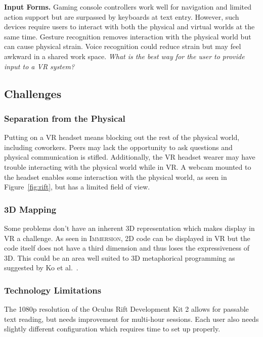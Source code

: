 \documentclass[conference]{IEEEtran}
\begin{document}
\textbf{Input Forms.}
Gaming console controllers work well for navigation and limited action support but are surpassed by keyboards at text entry.
However, such devices require users to interact with both the physical and virtual worlds at the same time.
Gesture recognition removes interaction with the physical world but can cause physical strain.
Voice recognition could reduce strain but may feel awkward in a shared work space.
\emph{What is the best way for the user to provide input to a VR system?}

\subsection{Challenges}

\subsubsection{Separation from the Physical}
Putting on a VR headset means blocking out the rest of the physical world, including coworkers.
Peers may lack the opportunity to ask questions and physical communication is stifled.
Additionally, the VR headset wearer may have trouble interacting with the physical world while in VR.
A webcam mounted to the headset enables some interaction with the physical world, as seen in Figure~\ref{fig:rift}, but has a limited field of view.

\subsubsection{3D Mapping}
Some problems don't have an inherent 3D representation which makes display in VR a challenge.
As seen in \textsc{Immersion}, 2D code can be displayed in VR but the code itself does not have a third dimension and thus loses the expressiveness of 3D.
This could be an area well suited to 3D metaphorical programming as suggested by Ko et al.~\cite{Ko:LearningBarriers}.

\subsubsection{Technology Limitations}

The 1080p resolution of the Oculus Rift Development Kit 2 allows for passable text reading, but needs improvement for multi-hour sessions. 
Each user also needs slightly different configuration which requires time to set up properly. 
\end{document}
